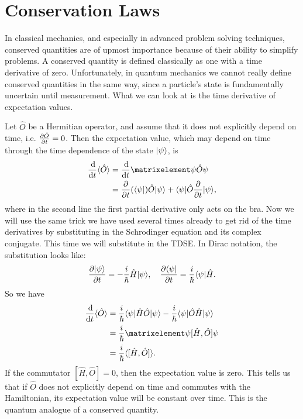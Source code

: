 \documentclass[../quantum_mechanics.tex]{subfiles}
\begin{document}
        
    \section{Conservation Laws}\label{sec:conservation-laws}
        In classical mechanics, and especially in advanced problem solving techniques, conserved quantities are of upmost importance because of their ability to simplify problems.
        A conserved quantity is defined classically as one with a time derivative of zero.
        Unfortunately, in quantum mechanics we cannot really define conserved quantities in the same way, since a particle's state is fundamentally uncertain until measurement.
        What we can look at is the time derivative of expectation values.

        Let $\hat{O}$ be a Hermitian operator, and assume that it does not explicitly depend on time, i.e. $\pdv{\hat{O}}{t}=0$.
        Then the expectation value, which may depend on time through the time dependence of the state $\lvert\psi\rangle$, is
        \begin{align}
            \dv{}{t}\langle\hat{O}\rangle&=\dv{}{t}\expval{\hat{O}}{\psi}\\
            &=\pdv{}{t}(\bra{\psi})\hat{O}\ket{\psi}+\bra{\psi}\hat{O}\pdv{}{t}\ket{\psi},
        \end{align}
        where in the second line the first partial derivative only acts on the bra.
        Now we will use the same trick we have used several times already to get rid of the time derivatives by substituting in the Schrodinger equation and its complex conjugate.
        This time we will substitute in the TDSE.
        In Dirac notation, the substitution looks like:
        \begin{equation}
            \pdv{\ket{\psi}}{t}=-\frac{i}{\hbar}\hat{H}\ket{\psi},\quad\pdv{\bra{\psi}}{t}=\frac{i}{\hbar}\bra{\psi}\hat{H}.
        \end{equation}
        So we have
        \begin{align}
            \dv{}{t}\langle\hat{O}\rangle&=\frac{i}{\hbar}\bra{\psi}\hat{H}\hat{O}\ket{\psi}-\frac{i}{\hbar}\bra{\psi}\hat{O}\hat{H}\ket{\psi}\\
            &=\frac{i}{\hbar}\expval{[\hat{H},\hat{O}]}{\psi}\\
            &=\frac{i}{\hbar}\langle[\hat{H},\hat{O}]\rangle.
        \end{align}
        If the commutator $[\hat{H},\hat{O}]=0$, then the expectation value is zero.
        This tells us that if $\hat{O}$ does not explicitly depend on time and commutes with the Hamiltonian, its expectation value will be constant over time.
        This is the quantum analogue of a conserved quantity.
\end{document}
